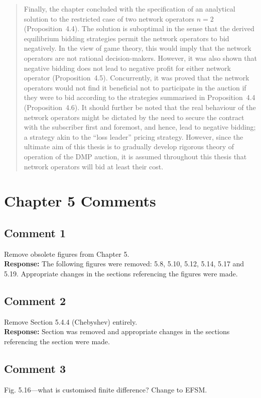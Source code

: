 \documentclass[10pt,a4paper,notitlepage]{article}
\numberwithin{equation}{section}
\begin{document}
\begin{quote}
Finally, the chapter concluded with the specification of an analytical solution to the restricted case of two network operators $n=2$ (Proposition~4.4). The solution is suboptimal in the sense that the derived equilibrium bidding strategies permit the network operators to bid negatively. In the view of game theory, this would imply that the network operators are not rational decision-makers. However, it was also shown that negative bidding does not lead to negative profit for either network operator (Proposition~4.5). Concurrently, it was proved that the network operators would not find it beneficial not to participate in the auction if they were to bid according to the strategies summarised in Proposition~4.4 (Proposition~4.6). It should further be noted that the real behaviour of the network operators might be dictated by the need to secure the contract with the subscriber first and foremost, and hence, lead to negative bidding; a strategy akin to the ``loss leader'' pricing strategy. However, since the ultimate aim of this thesis is to gradually develop rigorous theory of operation of the DMP auction, it is assumed throughout this thesis that network operators will bid at least their cost.
\end{quote}

\clearpage

\section{Chapter 5 Comments}
\subsection{Comment 1}
Remove obsolete figures from Chapter 5.\\[-2ex]

\textbf{Response:}
The following figures were removed: 5.8, 5.10, 5.12, 5.14, 5.17 and 5.19. Appropriate changes in the sections referencing the figures were made.

\subsection{Comment 2}
Remove Section 5.4.4 (Chebyshev) entirely.\\[-2ex]

\textbf{Response:}
Section was removed and appropriate changes in the sections referencing the section were made.

\subsection{Comment 3}
Fig. 5.16---what is customised finite difference? Change to EFSM.\\[-2ex]
\end{document}
